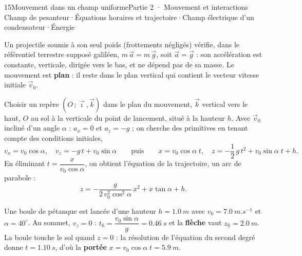 \begin{ouverture}[champuniforme]{15}{Mouvement dans un champ uniforme}{Partie 2 · Mouvement et interactions}
{Champ de pesanteur\enspace·\enspace Équations horaires et trajectoire\enspace·\enspace Champ électrique d'un condensateur\enspace·\enspace Énergie}
\end{ouverture}
\essentiel
{}
\begin{propriete}
Un projectile soumis à son seul poids (frottements négligés) vérifie, dans le référentiel terrestre supposé galiléen,
$m\,\vec{a}=m\,\vec{g}$, soit $\vec{a}=\vec{g}$ : son accélération est constante, verticale, dirigée vers le bas, et ne
dépend pas de sa masse. Le mouvement est \textbf{plan} : il reste dans le plan vertical qui contient le vecteur vitesse
initiale $\vec{v}_0$.
\end{propriete}
\begin{savoirfaire}
Choisir un repère $(O\,;\vec{\imath},\vec{k})$ dans le plan du mouvement, $\vec{k}$ vertical vers le haut, $O$ au sol à la
verticale du point de lancement, situé à la hauteur $h$. Avec $\vec{v}_0$ incliné d'un angle $\alpha$ :
$a_x=0$ et $a_z=-g$ ; on cherche des primitives en tenant compte des conditions initiales,
\[v_x=v_0\cos\alpha,\quad v_z=-g\,t+v_0\sin\alpha\qquad\text{puis}\qquad x=v_0\cos\alpha\;t,\quad z=-\frac12\,g\,t^2+v_0\sin\alpha\;t+h.\]
En éliminant $t=\dfrac{x}{v_0\cos\alpha}$, on obtient l'équation de la trajectoire, un arc de parabole :
\[z=-\frac{g}{2\,v_0^2\cos^2\alpha}\,x^2+x\tan\alpha+h.\]
\end{savoirfaire}
\begin{exemple}
Une boule de pétanque est lancée d'une hauteur $h=\qty{1,0}{m}$ avec $v_0=\qty{7,0}{m.s^{-1}}$ et $\alpha=40^\circ$. Au
sommet, $v_z=0$ : $t_\mathrm{S}=\dfrac{v_0\sin\alpha}{g}=\qty{0,46}{s}$ et la \textbf{flèche} vaut $z_\mathrm{S}=\qty{2,0}{m}$.
La boule touche le sol quand $z=0$ : la résolution de l'équation du second degré donne $t=\qty{1,10}{s}$, d'où la
\textbf{portée} $x=v_0\cos\alpha\;t=\qty{5,9}{m}$.
\end{exemple}
